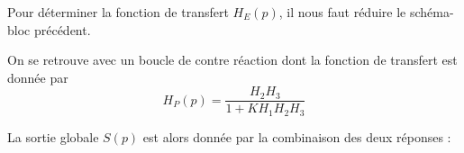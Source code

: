 Pour déterminer la fonction de transfert $H_E(p)$, il nous faut réduire le
schéma-bloc précédent.
\begin{center}
    
\end{center}
On se retrouve avec un boucle de contre réaction dont la fonction
de transfert est donnée par 
\[
    H_P(p)=\dfrac{H_2H_3}{1+KH_1H_2H_3}
\]

La sortie globale $S(p)$ est alors donnée par la combinaison des deux réponses :

